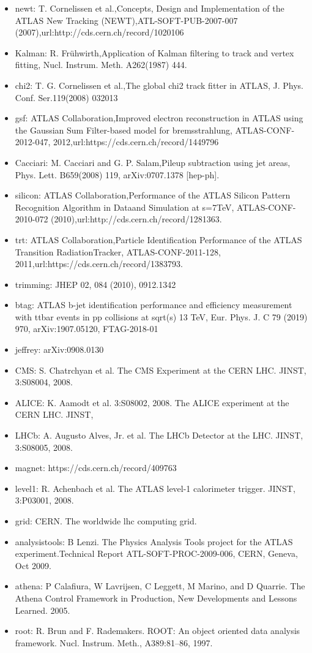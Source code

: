 \begin{itemize}
	\item newt: T. Cornelissen et al.,Concepts, Design and Implementation of the ATLAS New Tracking (NEWT),ATL-SOFT-PUB-2007-007 (2007),url:http://cds.cern.ch/record/1020106
	\item Kalman: R. Frühwirth,Application of Kalman filtering to track and vertex fitting, Nucl. Instrum. Meth. A262(1987) 444.
	\item chi2: T. G. Cornelissen et al.,The global chi2 track fitter in ATLAS, J. Phys. Conf. Ser.119(2008) 032013
	\item gsf: ATLAS Collaboration,Improved electron reconstruction in ATLAS using the Gaussian Sum Filter-based model for bremsstrahlung, ATLAS-CONF-2012-047, 2012,url:https://cds.cern.ch/record/1449796
	\item Cacciari: M. Cacciari and G. P. Salam,Pileup subtraction using jet areas, Phys. Lett. B659(2008) 119, arXiv:0707.1378 [hep-ph].
	\item silicon: ATLAS Collaboration,Performance of the ATLAS Silicon Pattern Recognition Algorithm in Dataand Simulation at s=7TeV, ATLAS-CONF-2010-072 (2010),url:http://cds.cern.ch/record/1281363.
	\item trt: ATLAS Collaboration,Particle Identification Performance of the ATLAS Transition RadiationTracker, ATLAS-CONF-2011-128, 2011,url:https://cds.cern.ch/record/1383793.
	\item trimming: JHEP 02, 084 (2010), 0912.1342
	\item btag:  ATLAS b-jet identification performance and efficiency measurement with ttbar events in pp collisions at sqrt(s) 13 TeV, Eur. Phys. J. C 79 (2019) 970, arXiv:1907.05120, FTAG-2018-01 
	\item jeffrey: arXiv:0908.0130
	\item CMS: S. Chatrchyan et al. The CMS Experiment at the CERN LHC. JINST, 3:S08004, 2008.
	\item ALICE: K. Aamodt et al. 3:S08002, 2008. The ALICE experiment at the CERN LHC. JINST,
	\item LHCb: A. Augusto Alves, Jr. et al. The LHCb Detector at the LHC. JINST, 3:S08005, 2008.
	\item magnet: https://cds.cern.ch/record/409763
	\item level1: R. Achenbach et al. The ATLAS level-1 calorimeter trigger. JINST, 3:P03001, 2008.
	\item grid: CERN. The worldwide lhc computing grid.
	\item analysistools: B Lenzi. The Physics Analysis Tools project for the ATLAS experiment.Technical Report ATL-SOFT-PROC-2009-006, CERN, Geneva, Oct 2009.
	\item athena: P Calafiura, W Lavrijsen, C Leggett, M Marino, and D Quarrie. The Athena 	Control Framework in Production, New Developments and Lessons Learned. 	2005.
	\item root: R. Brun and F. Rademakers. ROOT: An object oriented data analysis framework. Nucl. Instrum. Meth., A389:81–86, 1997.

\end{itemize}


